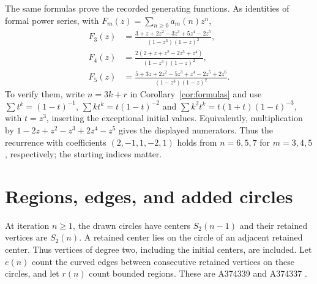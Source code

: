 \documentclass[11pt]{article}
\begin{document}
The same formulas prove the recorded generating functions. As identities
of formal power series, with $F_m(z)=\sum_{n\geq0}a_m(n)z^n$,
\[
\begin{aligned}
F_3(z)&=\frac{3+z+2z^2-3z^3+5z^4-2z^5}{(1-z^3)(1-z)^2},\\
F_4(z)&=\frac{2(2+z+z^2-2z^3+z^4)}{(1-z^3)(1-z)^2},\\
F_5(z)&=\frac{5+3z+2z^2-5z^3+z^4-2z^5+2z^6}{(1-z^3)(1-z)^2}.
\end{aligned}
\]
To verify them, write $n=3k+r$ in Corollary~\ref{cor:formulas} and use
$\sum t^k=(1-t)^{-1}$, $\sum kt^k=t(1-t)^{-2}$ and
$\sum k^2t^k=t(1+t)(1-t)^{-3}$, with $t=z^3$, inserting the exceptional
initial values. Equivalently, multiplication by
$1-2z+z^2-z^3+2z^4-z^5$ gives the displayed numerators.
Thus the recurrence with coefficients $(2,-1,1,-2,1)$ holds from $n=6,5,7$
for $m=3,4,5$, respectively; the starting indices matter.

\section{Regions, edges, and added circles}
At iteration $n\geq1$, the drawn circles have centers $S_2(n-1)$ and
their retained vertices are $S_2(n)$. A retained center lies on the circle
of an adjacent retained center. Thus vertices of degree two, including the
initial centers, are included. Let $e(n)$ count the curved edges between
consecutive retained vertices on these circles, and let $r(n)$ count
bounded regions. These are A374339 and A374337 \cite{edges,regions}.
\end{document}
